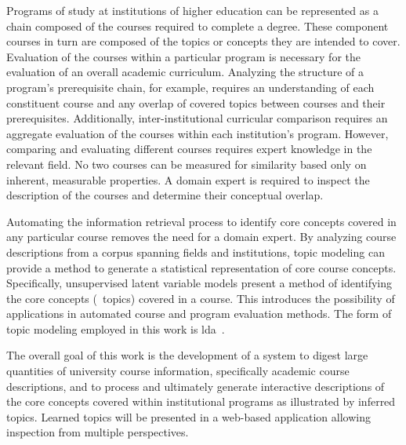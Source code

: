 
Programs of study at institutions of higher education can be represented as a chain composed of the courses required to complete a degree.
These component courses in turn are composed of the topics or concepts they are intended to cover.
Evaluation of the courses within a particular program is necessary for the evaluation of an overall academic curriculum.
Analyzing the structure of a program's prerequisite chain, for example, requires an understanding of each constituent course and any overlap of covered topics between courses and their prerequisites.
Additionally, inter-institutional curricular comparison requires an aggregate evaluation of the courses within each institution's program.
However, comparing and evaluating different courses requires expert knowledge in the relevant field.
No two courses can be measured for similarity based only on inherent, measurable properties.
A domain expert is required to inspect the description of the courses and determine their conceptual overlap.


Automating the information retrieval process to identify core concepts covered in any particular course removes the need for a domain expert.
By analyzing course descriptions from a corpus spanning fields and institutions, topic modeling can provide a method to generate a statistical representation of core course concepts.
Specifically, unsupervised latent variable models present a method of identifying the core concepts (\ie\ topics) covered in a course.
This introduces the possibility of applications in automated course and program evaluation methods.
The form of topic modeling employed in this work is \acf{lda}~\cite{Blei2003}.


The overall goal of this work is the development of a system to digest large quantities of university course information, specifically academic course descriptions, and to process and ultimately generate interactive descriptions of the core concepts covered within institutional programs as illustrated by inferred topics.
Learned topics will be presented in a web-based application allowing inspection from multiple perspectives.


